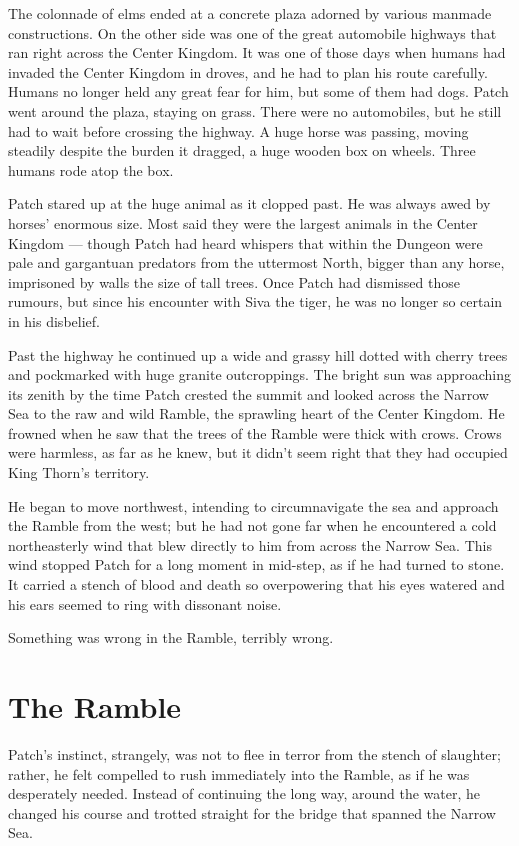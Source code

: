 \documentclass[ebook,oneside,openany,17pt]{memoir}
\renewcommand{\thechapter}{\Roman{chapter}}
\newcounter{sections}
\newcommand{\sections}[1]{%
  \section*{#1}
  \addtocounter{sections}{1}%
  \pdfbookmark[1]{#1}{section.\thechapter.\thesections}}
\begin{document}
The colonnade of elms ended at a concrete plaza adorned by various
manmade constructions. On the other side was one of the great
automobile highways that ran right across the Center Kingdom. It was
one of those days when humans had invaded the Center Kingdom in
droves, and he had to plan his route carefully. Humans no longer held
any great fear for him, but some of them had dogs. Patch went around
the plaza, staying on grass. There were no automobiles, but he still
had to wait before crossing the highway. A huge horse was passing,
moving steadily despite the burden it dragged, a huge wooden box on
wheels. Three humans rode atop the box.

Patch stared up at the huge animal as it clopped past. He was always
awed by horses’ enormous size. Most said they were the largest animals
in the Center Kingdom — though Patch had heard whispers that within
the Dungeon were pale and gargantuan predators from the uttermost
North, bigger than any horse, imprisoned by walls the size of tall
trees. Once Patch had dismissed those rumours, but since his encounter
with Siva the tiger, he was no longer so certain in his disbelief.

Past the highway he continued up a wide and grassy hill dotted with
cherry trees and pockmarked with huge granite outcroppings. The bright
sun was approaching its zenith by the time Patch crested the summit
and looked across the Narrow Sea to the raw and wild Ramble, the
sprawling heart of the Center Kingdom. He frowned when he saw that the
trees of the Ramble were thick with crows. Crows were harmless, as far
as he knew, but it didn’t seem right that they had occupied King
Thorn’s territory.

He began to move northwest, intending to circumnavigate the sea and
approach the Ramble from the west; but he had not gone far when he
encountered a cold northeasterly wind that blew directly to him from
across the Narrow Sea. This wind stopped Patch for a long moment in
mid-step, as if he had turned to stone. It carried a stench of blood
and death so overpowering that his eyes watered and his ears seemed to
ring with dissonant noise.

Something was wrong in the Ramble, terribly wrong.


\sections{The Ramble}

Patch’s instinct, strangely, was not to flee in terror from the stench
of slaughter; rather, he felt compelled to rush immediately into the
Ramble, as if he was desperately needed. Instead of continuing the
long way, around the water, he changed his course and trotted straight
for the bridge that spanned the Narrow Sea.
\end{document}
